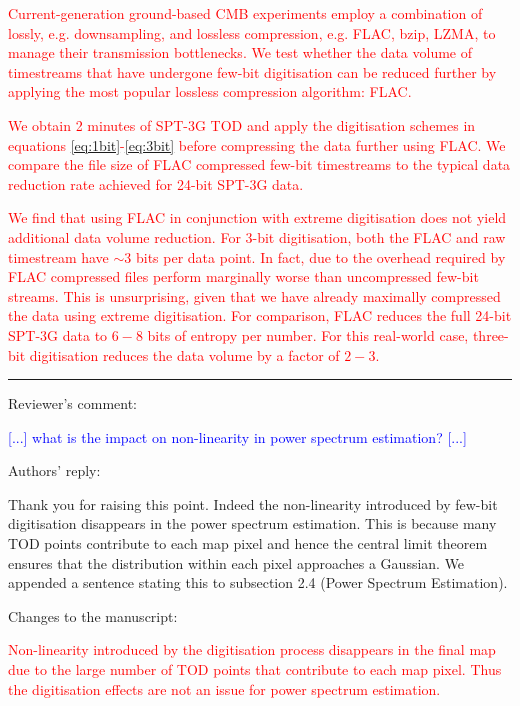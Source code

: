 \documentclass{article}
\newcommand{\changed}[1]{\textcolor{Red}{#1}}
\newcommand{\question}[1]{\textcolor{Blue}{#1}}
\newlength\tindent
\renewcommand{\indent}{\hspace*{\tindent}}
\begin{document}
\changed{Current-generation ground-based CMB experiments employ a combination of lossly, e.g. downsampling, and lossless compression, e.g. FLAC, bzip, LZMA, to manage their transmission bottlenecks. We test whether the data volume of timestreams that have undergone few-bit digitisation can be reduced further by applying the most popular lossless compression algorithm: FLAC. }

\changed{We obtain 2 minutes of SPT-3G TOD and apply the digitisation schemes in equations \ref{eq:1bit}-\ref{eq:3bit} before compressing the data further using FLAC. We compare the file size of FLAC compressed few-bit timestreams to the typical data reduction rate achieved for 24-bit SPT-3G data.}

\changed{We find that using FLAC in conjunction with extreme digitisation does not yield additional data volume reduction. For 3-bit digitisation, both the FLAC and raw timestream have $\sim$3 bits per data point. In fact, due to the overhead required by FLAC compressed files perform marginally worse than uncompressed few-bit streams. This is unsurprising, given that we have already maximally compressed the data using extreme digitisation. For comparison, FLAC reduces the full 24-bit  SPT-3G data to $6-8$ bits of entropy per number. For this real-world case, three-bit digitisation reduces the data volume by a factor of $2-3$.}

\vspace{0.5cm}

\hrule

\vspace{0.5cm}

Reviewer's comment:

\indent \question{[...] what is the impact on non-linearity in power spectrum estimation? [...]}

\vspace{0.25cm}

Authors' reply:

\indent Thank you for raising this point. Indeed the non-linearity introduced by few-bit digitisation disappears in the power spectrum estimation. This is because many TOD points contribute to each map pixel and hence the central limit theorem ensures that the distribution within each pixel approaches a Gaussian. We appended a sentence stating this to subsection 2.4 (Power Spectrum Estimation).

\vspace{0.25cm}

Changes to the manuscript:

\indent \changed{Non-linearity introduced by the digitisation process disappears in the final map due to the large number of TOD points that contribute to each map pixel. Thus the digitisation effects are not an issue for power spectrum estimation.}
\end{document}
